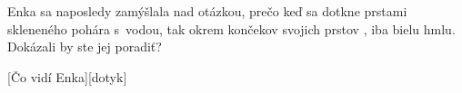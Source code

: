 Enka sa naposledy zamýšlala nad otázkou, prečo keď sa dotkne prstami skleneného pohára s~vodou, tak okrem končekov svojich prstov , iba bielu hmlu. Dokázali by ste jej poradiť?


[Čo vidí Enka][dotyk]
